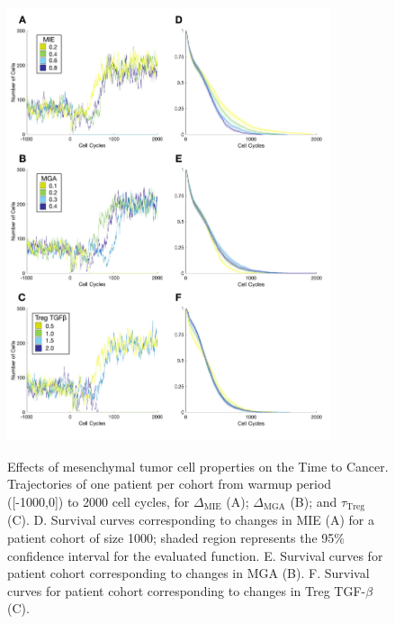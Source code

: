 \documentclass[11pt]{article}
\begin{document}
\begin{figure}
\center
{\includegraphics[width=0.85\textwidth]{Figure3/Figure3.pdf}}
\caption{Effects of mesenchymal tumor cell properties on the Time to Cancer. Trajectories of one patient per cohort from warmup period ([-1000,0]) to 2000 cell cycles, for $\Delta_\text{MIE}$ (A); $\Delta_\text{MGA}$ (B); and $\tau_\text{Treg}$ (C). 
D. Survival curves corresponding to changes in MIE (A) for a patient cohort of size 1000; shaded region represents the 95\% confidence interval for the evaluated function. 
E. Survival curves for patient cohort corresponding to changes in MGA (B).
F. Survival curves for patient cohort corresponding to changes in Treg TGF-$\beta$ (C). 
}
\label{fig:FirstSurvivalCurves}
\end{figure}
\end{document}
